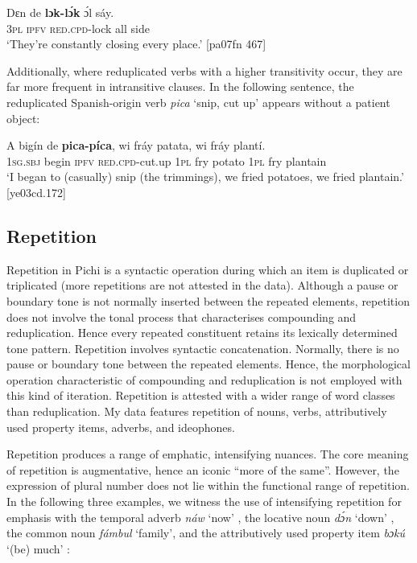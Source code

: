 \ea%
    \label{ex:key:144}
    \gll Dɛn  de  \textbf{lɔk-lɔ́k}    ɔ́l  sáy.\\
\textsc{3pl}  \textsc{ipfv}  \textsc{red.cpd-}lock  all  side\\

\glt ‘They’re constantly closing every place.’ [pa07fn 467]
\z

Additionally, where reduplicated verbs with a higher transitivity occur, they are far more frequent in intransitive clauses. In the following sentence, the reduplicated Spanish-origin verb \textit{pica} ‘snip, cut up’ appears without a patient object: 


\ea%
    \label{ex:key:145}
    \gll \MakeUppercase{A}   bigín  de \textbf{  pica-píca},    wi  fráy  patata,  wi  fráy  plantí.\\
\textsc{1sg.sbj}  begin  \textsc{ipfv}  \textsc{red.cpd-}cut.up  \textsc{1pl}  fry  potato  \textsc{1pl}  fry  plantain\\

\glt ‘I began to  (casually) snip (the trimmings), we fried potatoes, we fried plantain.’ [ye03cd.172]
\z

\subsection{Repetition}

Repetition in Pichi is a syntactic operation during which an item is duplicated or triplicated (more repetitions are not attested in the data). Although a pause or boundary tone is not normally inserted between the repeated elements, repetition does not involve the tonal process that characterises compounding and reduplication. Hence every repeated constituent retains its lexically determined tone pattern. Repetition involves syntactic concatenation. Normally, there is no pause or boundary tone between the repeated elements. Hence, the morphological operation characteristic of compounding and reduplication is not employed with this kind of iteration. Repetition is attested with a wider range of word classes than reduplication. My data features repetition of nouns, verbs, attributively used property items, adverbs, and ideophones. 


Repetition produces a range of emphatic, intensifying nuances. The core meaning of repetition is augmentative, hence an iconic “more of the same”. However, the expression of plural number does not lie within the functional range of repetition. In the following three examples, we witness the use of intensifying repetition for emphasis with the temporal adverb \textit{náw} ‘now’ , the locative noun \textit{dɔ́n} ‘down’ , the common noun \textit{fámbul} ‘family’, and the attributively used property item \textit{bɔkú} ‘(be) much’ : 



